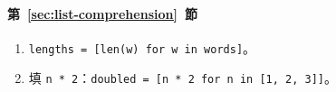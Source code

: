 \paragraph{第~\ref{sec:list-comprehension}~節}
\begin{enumerate}
\item \texttt{lengths = [len(w) for w in words]}。
\item 填 \texttt{n * 2}：\texttt{doubled = [n * 2 for n in [1, 2, 3]]}。
\end{enumerate}
